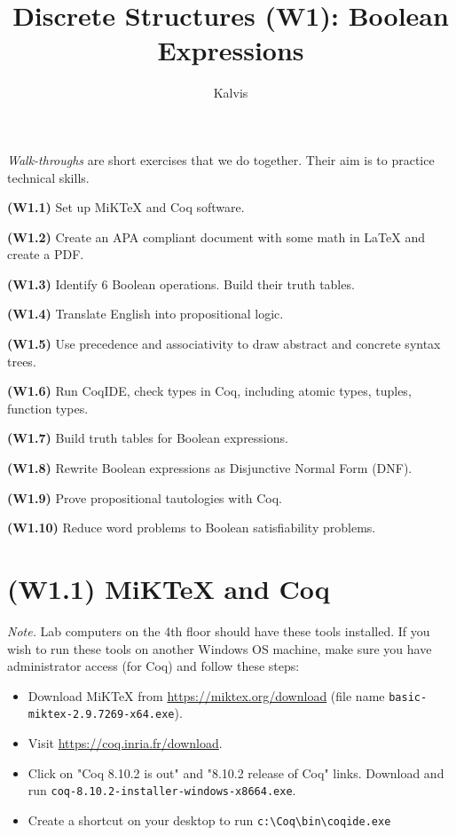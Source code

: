 \documentclass[jou]{apa6}
\title{Discrete Structures (W1): Boolean Expressions}
\author{Kalvis}
\affiliation{RBS}
\begin{document}
\maketitle

{\em Walk-throughs} are short exercises that we do together. Their 
aim is to practice technical skills.


{\bf (W1.1)} Set up MiKTeX and Coq software.

{\bf (W1.2)} Create an APA compliant document with some math 
in LaTeX and create a PDF.

{\bf (W1.3)} Identify 6 Boolean operations. Build 
their truth tables.

{\bf (W1.4)} Translate English into propositional logic.

{\bf (W1.5)} Use precedence and associativity to draw abstract and concrete syntax trees.

{\bf (W1.6)} Run CoqIDE, check types in Coq, including atomic types, 
tuples, function types.

{\bf (W1.7)} Build truth tables for Boolean expressions.

{\bf (W1.8)} Rewrite Boolean expressions as Disjunctive Normal Form (DNF).

{\bf (W1.9)} Prove propositional tautologies with Coq.

{\bf (W1.10)} Reduce word problems to Boolean satisfiability problems.


\section{(W1.1) MiKTeX and Coq}

{\em Note.} Lab computers on the 4th floor should have these
tools installed. 
If you wish to run these tools on another Windows OS machine, 
make sure you have administrator access (for Coq) and follow 
these steps:

\begin{itemize}
\item Download MiKTeX from \url{https://miktex.org/download}
(file name {\tt basic-miktex-2.9.7269-x64.exe}). 
\item Visit \url{https://coq.inria.fr/download}. 
\item Click on "Coq 8.10.2 is out" and "8.10.2 release of Coq" links. 
Download and run {\tt coq-8.10.2-installer-windows-x86\textunderscore{}64.exe}. 
\item Create a shortcut on your desktop to run 
{\tt c:\textbackslash{}Coq\textbackslash{}bin\textbackslash{}coqide.exe}
\end{itemize}
\end{document}
